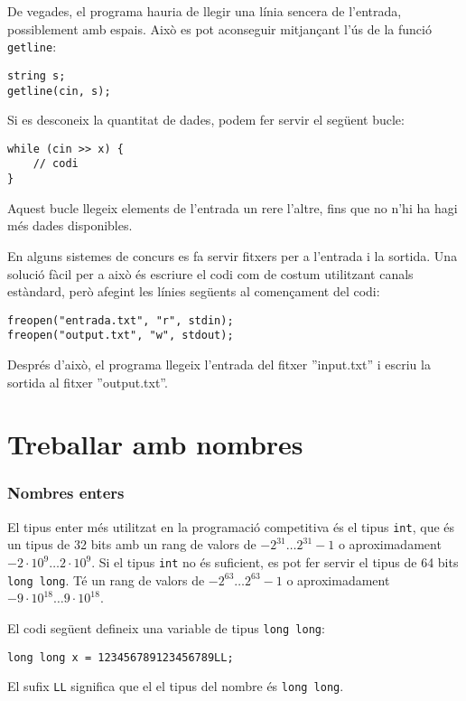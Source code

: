 De vegades, el programa hauria de llegir una línia sencera
de l'entrada, possiblement amb espais.
Això es pot aconseguir mitjançant l'ús de
la funci\'o \texttt{getline}:

\begin{lstlisting}
string s;
getline(cin, s);
\end{lstlisting}

Si es desconeix la quantitat de dades, podem fer servir el
següent bucle:
\begin{lstlisting}
while (cin >> x) {
    // codi
}
\end{lstlisting}
Aquest bucle llegeix elements de l'entrada
un rere l'altre, fins que no n'hi ha
hagi més dades disponibles.

En alguns sistemes de concurs es fa servir fitxers per
a l'entrada i la sortida.
Una solució fàcil per a això és escriure
el codi com de costum utilitzant canals estàndard,
però afegint les línies següents al començament del codi:
\begin{lstlisting}
freopen("entrada.txt", "r", stdin);
freopen("output.txt", "w", stdout);
\end{lstlisting}
Després d'això, el programa llegeix l'entrada del fitxer
''input.txt'' i escriu la sortida al fitxer
''output.txt''.

\section{Treballar amb nombres}


\subsubsection{Nombres enters}

El tipus enter més utilitzat en la programació competitiva
és el tipus \texttt{int}, que és un tipus de 32 bits amb
un rang de valors de $-2^{31} \ldots 2^{31}-1$
o aproximadament $-2 \cdot 10^9 \ldots 2 \cdot 10^9$.
Si el tipus \texttt{int} no és suficient,
es pot fer servir el tipus de 64 bits \texttt{long long}.
Té un rang de valors de $-2^{63} \ldots 2^{63}-1$
o aproximadament $-9 \cdot 10^{18} \ldots 9 \cdot 10^{18}$.

El codi següent defineix una
variable de tipus \texttt{long long}:
\begin{lstlisting}
long long x = 123456789123456789LL;
\end{lstlisting}
El sufix \texttt{LL} significa que el
el tipus del nombre és \texttt{long long}.

